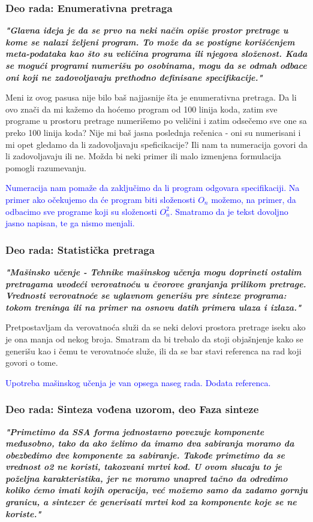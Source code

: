 \documentclass[a4paper]{report}
\newcommand{\odgovor}[1]{\textcolor{blue}{#1}}
\begin{document}
\subsubsection{Deo rada: Enumerativna pretraga}
\textbf{\textit{"Glavna ideja je da se prvo na neki način opiše prostor pretrage u kome se nalazi željeni program. To može da se postigne korišćenjem meta-podataka kao što su veličina programa ili
njegova složenost. Kada se mogući programi numerišu po osobinama, mogu da se odmah odbace oni koji ne zadovoljavaju prethodno definisane specifikacije."}}

Meni iz ovog pasusa nije bilo baš najjasnije šta je enumerativna pretraga. Da li ovo znači da mi kažemo da hoćemo program od 100 linija koda, zatim sve programe u prostoru pretrage numerišemo po veličini i zatim odsečemo sve one sa preko 100 linija koda? Nije mi baš jasna poslednja rečenica - oni su numerisani i mi opet gledamo da li zadovoljavaju speficikacije? Ili nam ta numeracija govori da li zadovoljavaju ili ne. Možda bi neki primer ili malo izmenjena formulacija pomogli razumevanju.

\odgovor{Numeracija nam pomaže da zaključimo da li program odgovara specifikaciji. Na primer ako očekujemo da će program biti složenosti $O_n$ možemo, na primer, da odbacimo sve programe koji su složenosti $O_n^2$. Smatramo da je tekst dovoljno jasno napisan, te ga nismo menjali.}


\subsubsection{Deo rada: Statistička pretraga}
\textbf{\textit{"Mašinsko učenje - Tehnike mašinskog učenja mogu doprineti ostalim pretragama uvodeći verovatnoću u čvorove granjanja prilikom pretrage. Vrednosti verovatnoće se uglavnom generišu pre sinteze programa: tokom treninga ili na primer na osnovu datih primera ulaza i izlaza."}}

Pretpostavljam da verovatnoća služi da se neki delovi prostora pretrage iseku ako je ona manja od nekog broja. Smatram da bi trebalo da stoji objašnjenje kako se generišu kao i čemu te verovatnoće služe, ili da se bar stavi referenca na rad koji govori o tome.

\odgovor {Upotreba mašinskog učenja je van opsega naseg rada. Dodata referenca.}


\subsubsection{Deo rada: Sinteza vođena uzorom, deo Faza sinteze}
\textbf{\textit{"Primetimo da SSA forma jednostavno povezuje komponente međusobno, tako da ako želimo da imamo dva sabiranja moramo da obezbedimo dve komponente za sabiranje. Takođe primetimo da se vrednost o2 ne koristi, takozvani mrtvi kod. U ovom slucaju to je poželjna karakteristika, jer ne moramo unapred tačno da odredimo koliko ćemo imati kojih operacija, već možemo samo da zadamo gornju granicu, a sintezer će generisati mrtvi kod za komponente koje se ne koriste."}}
\end{document}

